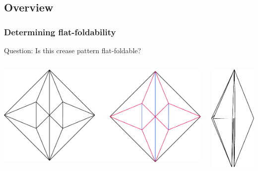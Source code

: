 \documentclass{beamer}
\begin{document}
\def\O{\mathcal{L}}

\subsection{Overview}
\begin{frame} 
\frametitle{Determining flat-foldability}

\begin{block}{Question:}
Is this crease pattern flat-foldable?
\end{block} 

\bigskip

\begin{columns}[c]
\includegraphics[width=\textwidth]{sam_images/bird-base-unfolded.pdf}

\pause

\includegraphics[height=.5\textheight]{sam_images/bird-base-folded.pdf}

\end{columns}

\end{frame}
\end{document}
